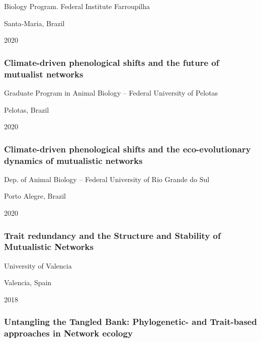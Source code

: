 \documentclass[
]{article}
\begin{document}
Biology Program. Federal Institute Farroupilha

Santa-Maria, Brazil

2020

\hypertarget{climate-driven-phenological-shifts-and-the-future-of-mutualist-networks}{%
\subsubsection{Climate-driven phenological shifts and the future of
mutualist
networks}\label{climate-driven-phenological-shifts-and-the-future-of-mutualist-networks}}

Graduate Program in Animal Biology -- Federal University of Pelotas

Pelotas, Brazil

2020

\hypertarget{climate-driven-phenological-shifts-and-the-eco-evolutionary-dynamics-of-mutualistic-networks}{%
\subsubsection{Climate-driven phenological shifts and the
eco-evolutionary dynamics of mutualistic
networks}\label{climate-driven-phenological-shifts-and-the-eco-evolutionary-dynamics-of-mutualistic-networks}}

Dep. of Animal Biology -- Federal University of Rio Grande do Sul

Porto Alegre, Brazil

2020

\hypertarget{trait-redundancy-and-the-structure-and-stability-of-mutualistic-networks}{%
\subsubsection{Trait redundancy and the Structure and Stability of
Mutualistic
Networks}\label{trait-redundancy-and-the-structure-and-stability-of-mutualistic-networks}}

University of Valencia

Valencia, Spain

2018

\hypertarget{untangling-the-tangled-bank-phylogenetic--and-trait-based-approaches-in-network-ecology}{%
\subsubsection{Untangling the Tangled Bank: Phylogenetic- and
Trait-based approaches in Network
ecology}\label{untangling-the-tangled-bank-phylogenetic--and-trait-based-approaches-in-network-ecology}}
\end{document}

